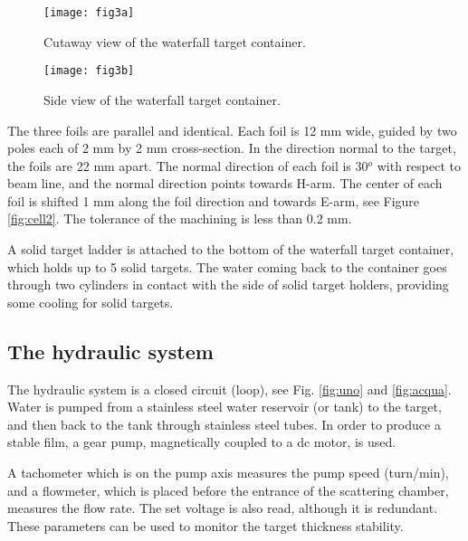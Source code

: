\begin{figure}[htp]
\begin{center}
\texttt{[image: fig3a]}
\caption[Waterfall Target: Target Container]{Cutaway view of the waterfall target container.}
\label{fig:cell3a}
\end{center}
\end{figure}

\begin{figure}[htp]
\begin{center}
\texttt{[image: fig3b]}
\caption[Waterfall Target: Side View]{Side view of the waterfall target container.}
\label{fig:cell3b}
\end{center}
\end{figure}


The three foils are parallel and identical. Each foil is 12 mm wide, 
guided by two poles each of 2 mm by 2 mm cross-section. 
In the direction normal to the target, the foils are 22 mm 
apart. The normal direction of each foil is 30$^o$ with respect to beam line, 
and the normal direction points  towards H-arm. The center of each foil is 
shifted 1 mm along the foil direction and towards E-arm, see Figure 
\ref{fig:cell2}. The tolerance of the 
machining is less than 0.2 mm.  

A solid target ladder is attached to the bottom of the waterfall target 
container, which holds up to 5 solid targets. The 
water coming back to the container goes through two cylinders
in contact with the side of solid target holders, providing some cooling for
solid targets. 

\subsection{The hydraulic system}

The hydraulic system is a closed circuit (loop), see Fig. \ref{fig:uno} and 
\ref{fig:acqua}. Water is pumped from a stainless steel water
reservoir (or tank)
to the target, and then back to the tank through stainless steel tubes.
In order to produce a stable film, a gear  pump, magnetically coupled to a 
dc motor, is used.

A tachometer which is on the pump axis measures the pump speed (turn/min), 
and a flowmeter, which is placed before the entrance of the 
scattering chamber, measures the flow rate. The set
voltage is also read, although it is redundant.
These parameters can be used to
monitor the target thickness stability.

